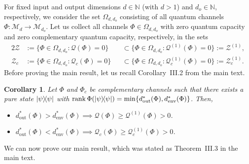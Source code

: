 \documentclass[a4paper,onecolumn,10pt,accepted=2022-07-11]{quantumarticle}
\newcommand{\M}[1]{\mathcal{M}_{#1}}
\newcommand{\env}{\operatorname{env}}
\newcommand{\out}{\operatorname{out}}
\newtheorem{corollary}[theorem]{Corollary}
\theoremstyle{definition}
\begin{document}
For fixed input and output dimensions $d\in\mathbb{N}$ (with $d>1$) and $d_o\in\mathbb{N}$, respectively, we consider the set $\Omega_{d,d_o}$ consisting of all quantum channels $\Phi:\M{d}\to \M{d_o}$. Let us collect all channels $\Phi\in\Omega_{d,d_o}$ with zero quantum capacity and zero complementary quantum capacity, respectively, in the sets
\begin{alignat}{2}
    \mathcal{Z} &:= \{\Phi\in \Omega_{d,d_o} : \mathcal{Q}(\Phi)=0 \} &&\subset \{\Phi\in \Omega_{d,d_o} : \mathcal{Q}^{(1)}(\Phi)=0 \} := \mathcal{Z}^{(1)},  \\
    \mathcal{Z}_c &:= \{\Phi\in \Omega_{d,d_o} : \mathcal{Q}_c(\Phi)=0\} &&\subset \{\Phi\in \Omega_{d,d_o} : \mathcal{Q}^{(1)}_c(\Phi)=0 \} := \mathcal{Z}^{(1)}_c.
\end{alignat}
Before proving the main result, let us recall Corollary~III.2 from the main text.

\begin{corollary}\label{corollary:blabla}
Let $\Phi$ and $\Phi_c$ be complementary channels such that there exists a pure state $\ketbra{\psi}$ with $\operatorname{rank}\Phi(\ketbra{\psi})= \min\{d^*_{\out}(\Phi),d^*_{\env}(\Phi)\}$. Then,
\begin{itemize}
    \item $d^{*}_{\out}(\Phi)>d^{*}_{\operatorname{env}}(\Phi)\implies \mathcal{Q}(\Phi)\geq\mathcal{Q}^{(1)}(\Phi)>0$.
    \item $d^{*}_{\out}(\Phi)<d^{*}_{\operatorname{env}}(\Phi)\implies\mathcal{Q}_c(\Phi)\geq\mathcal{Q}^{(1)}_c(\Phi)>0$.
    \end{itemize}
\end{corollary}

We can now prove our main result, which was stated as Theorem~III.3 in the main text.
\end{document}
